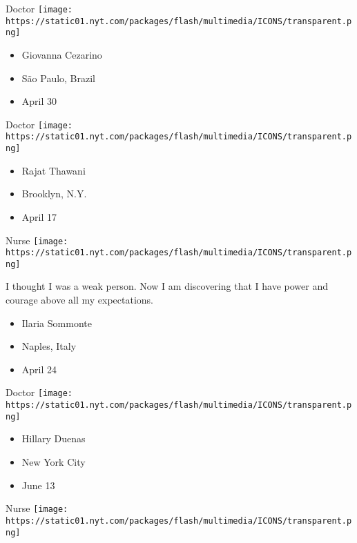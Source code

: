 \protect\hyperlink{item-giovanna-cezarino}{}

Doctor
\texttt{[image: https://static01.nyt.com/packages/flash/multimedia/ICONS/transparent.png]}

\begin{itemize}
\tightlist
\item
  Giovanna Cezarino
\item
  São Paulo, Brazil
\item
  April 30
\end{itemize}

\protect\hyperlink{item-rajat-thawani}{}

Doctor
\texttt{[image: https://static01.nyt.com/packages/flash/multimedia/ICONS/transparent.png]}

\begin{itemize}
\tightlist
\item
  Rajat Thawani
\item
  Brooklyn, N.Y.
\item
  April 17
\end{itemize}

\protect\hyperlink{item-ilaria-sommonte}{}

Nurse
\texttt{[image: https://static01.nyt.com/packages/flash/multimedia/ICONS/transparent.png]}

I thought I was a weak person. Now I am discovering that I have power
and courage above all my expectations.

\begin{itemize}
\tightlist
\item
  Ilaria Sommonte
\item
  Naples, Italy
\item
  April 24
\end{itemize}

\protect\hyperlink{item-hillary-duenas}{}

Doctor
\texttt{[image: https://static01.nyt.com/packages/flash/multimedia/ICONS/transparent.png]}

\begin{itemize}
\tightlist
\item
  Hillary Duenas
\item
  New York City
\item
  June 13
\end{itemize}

\protect\hyperlink{item-chan-pich}{}

Nurse
\texttt{[image: https://static01.nyt.com/packages/flash/multimedia/ICONS/transparent.png]}

